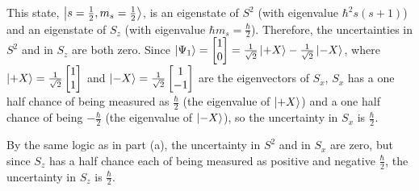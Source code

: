 \documentclass{article}
\begin{document}
\bigskip
\noindent{}\bigskip\par
This state, $\left\lvert s= \frac{1}{2}, m_s = \frac{1}{2} \right\rangle$, is an eigenstate of $S^2$ (with eigenvalue $\hbar^2 s (s+1)$) and an eigenstate of $S_z$ (with eigenvalue $\hbar m_s = \frac{\hbar}{2}$). Therefore, the uncertainties in $S^2$ and in $S_z$ are both zero. Since $\left\lvert \Psi_1 \right\rangle = \begin{bmatrix}
    1 \\
    0
\end{bmatrix} = \frac{1}{\sqrt{2}} \left\lvert +X \right\rangle - \frac{1}{\sqrt{2}} \left\lvert -X \right\rangle$, where $\left\lvert +X \right\rangle = \frac{1}{\sqrt{2}} \begin{bmatrix}
    1 \\
    1
\end{bmatrix}$ and $\left\lvert -X \right\rangle = \frac{1}{\sqrt{2}}\begin{bmatrix}
    1 \\
    -1
\end{bmatrix}$ are the eigenvectors of $S_x$, $S_x$ has a one half chance of being measured as $\frac{\hbar}{2}$ (the eigenvalue of $\left\lvert +X \right\rangle$) and a one half chance of being $-\frac{\hbar}{2}$ (the eigenvalue of $\left\lvert -X \right\rangle$), so the uncertainty in $S_x$ is $\frac{\hbar}{2}$.

\bigskip
\noindent{}\bigskip\par
By the same logic as in part (a), the uncertainty in $S^2$ and in $S_x$ are zero, but since $S_z$ has a half chance each of being measured as positive and negative $\frac{\hbar}{2}$, the uncertainty in $S_z$ is $\frac{\hbar}{2}$.
\bigskip


\end{document}
